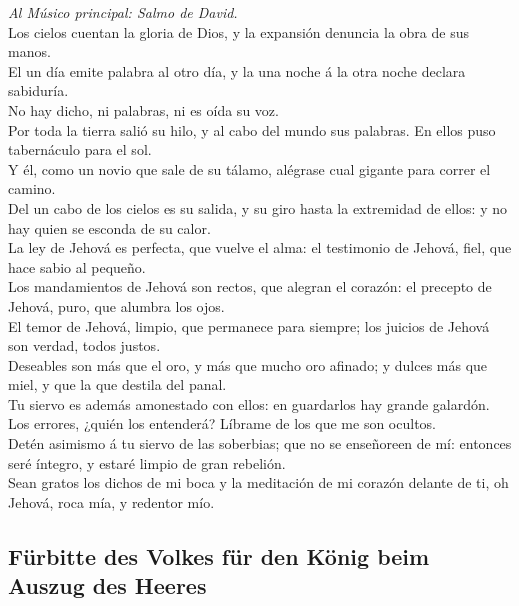  \emph{Al Músico principal: Salmo de David.}\\
Los cielos cuentan la gloria de Dios, y la expansión denuncia la obra de
sus manos.\\
 El un día emite palabra al otro día, y la una noche á la
otra noche declara sabiduría.\\
 No hay dicho, ni palabras, ni es oída su voz.\\
 Por toda la tierra salió su hilo, y al cabo del mundo sus
palabras. En ellos puso tabernáculo para el sol.\\
 Y él, como un novio que sale de su tálamo, alégrase cual
gigante para correr el camino.\\
 Del un cabo de los cielos es su salida, y su giro hasta la
extremidad de ellos: y no hay quien se esconda de su calor.\\
 La ley de Jehová es perfecta, que vuelve el alma: el
testimonio de Jehová, fiel, que hace sabio al pequeño.\\
 Los mandamientos de Jehová son rectos, que alegran el
corazón: el precepto de Jehová, puro, que alumbra los ojos.\\
 El temor de Jehová, limpio, que permanece para siempre; los
juicios de Jehová son verdad, todos justos.\\
 Deseables son más que el oro, y más que mucho oro afinado;
y dulces más que miel, y que la que destila del panal.\\
 Tu siervo es además amonestado con ellos: en guardarlos
hay grande galardón.\\
 Los errores, ¿quién los entenderá? Líbrame de los que me
son ocultos.\\
 Detén asimismo á tu siervo de las soberbias; que no se
enseñoreen de mí: entonces seré íntegro, y estaré limpio de gran
rebelión.\\
 Sean gratos los dichos de mi boca y la meditación de mi
corazón delante de ti, oh Jehová, roca mía, y redentor mío.

\hypertarget{fuxfcrbitte-des-volkes-fuxfcr-den-kuxf6nig-beim-auszug-des-heeres}{%
\subsection{Fürbitte des Volkes für den König beim Auszug des
Heeres}\label{fuxfcrbitte-des-volkes-fuxfcr-den-kuxf6nig-beim-auszug-des-heeres}}

